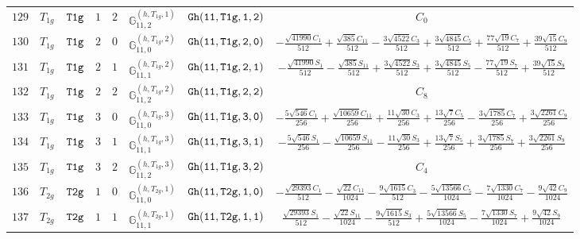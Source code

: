 \documentclass[fleqn,8pt]{jsarticle}
\begin{document}
\begin{table}[ht!]
\begin{center}
\begin{tabular}{cccccccc}
$ 129 $ & $ T_{1g} $ & $ {\tt T1g} $ & $ 1 $ & $ 2 $ & $ \mathbb{G}_{11,2}^{(h,T_{1g},1)} $ & $ {\tt Gh(11,T1g,1,2)} $ & $ C_{0} $ \\
$ 130 $ & $ T_{1g} $ & $ {\tt T1g} $ & $ 2 $ & $ 0 $ & $ \mathbb{G}_{11,0}^{(h,T_{1g},2)} $ & $ {\tt Gh(11,T1g,2,0)} $ & $ - \frac{\sqrt{41990} C_{1}}{512} + \frac{\sqrt{385} C_{11}}{512} - \frac{3 \sqrt{4522} C_{3}}{512} + \frac{3 \sqrt{4845} C_{5}}{512} + \frac{77 \sqrt{19} C_{7}}{512} + \frac{39 \sqrt{15} C_{9}}{512} $ \\
$ 131 $ & $ T_{1g} $ & $ {\tt T1g} $ & $ 2 $ & $ 1 $ & $ \mathbb{G}_{11,1}^{(h,T_{1g},2)} $ & $ {\tt Gh(11,T1g,2,1)} $ & $ - \frac{\sqrt{41990} S_{1}}{512} - \frac{\sqrt{385} S_{11}}{512} + \frac{3 \sqrt{4522} S_{3}}{512} + \frac{3 \sqrt{4845} S_{5}}{512} - \frac{77 \sqrt{19} S_{7}}{512} + \frac{39 \sqrt{15} S_{9}}{512} $ \\
$ 132 $ & $ T_{1g} $ & $ {\tt T1g} $ & $ 2 $ & $ 2 $ & $ \mathbb{G}_{11,2}^{(h,T_{1g},2)} $ & $ {\tt Gh(11,T1g,2,2)} $ & $ C_{8} $ \\
$ 133 $ & $ T_{1g} $ & $ {\tt T1g} $ & $ 3 $ & $ 0 $ & $ \mathbb{G}_{11,0}^{(h,T_{1g},3)} $ & $ {\tt Gh(11,T1g,3,0)} $ & $ - \frac{5 \sqrt{546} C_{1}}{256} + \frac{\sqrt{10659} C_{11}}{256} + \frac{11 \sqrt{30} C_{3}}{256} + \frac{13 \sqrt{7} C_{5}}{256} - \frac{3 \sqrt{1785} C_{7}}{256} + \frac{3 \sqrt{2261} C_{9}}{256} $ \\
$ 134 $ & $ T_{1g} $ & $ {\tt T1g} $ & $ 3 $ & $ 1 $ & $ \mathbb{G}_{11,1}^{(h,T_{1g},3)} $ & $ {\tt Gh(11,T1g,3,1)} $ & $ - \frac{5 \sqrt{546} S_{1}}{256} - \frac{\sqrt{10659} S_{11}}{256} - \frac{11 \sqrt{30} S_{3}}{256} + \frac{13 \sqrt{7} S_{5}}{256} + \frac{3 \sqrt{1785} S_{7}}{256} + \frac{3 \sqrt{2261} S_{9}}{256} $ \\
$ 135 $ & $ T_{1g} $ & $ {\tt T1g} $ & $ 3 $ & $ 2 $ & $ \mathbb{G}_{11,2}^{(h,T_{1g},3)} $ & $ {\tt Gh(11,T1g,3,2)} $ & $ C_{4} $ \\
$ 136 $ & $ T_{2g} $ & $ {\tt T2g} $ & $ 1 $ & $ 0 $ & $ \mathbb{G}_{11,0}^{(h,T_{2g},1)} $ & $ {\tt Gh(11,T2g,1,0)} $ & $ - \frac{\sqrt{29393} C_{1}}{512} - \frac{\sqrt{22} C_{11}}{1024} - \frac{9 \sqrt{1615} C_{3}}{512} - \frac{5 \sqrt{13566} C_{5}}{1024} - \frac{7 \sqrt{1330} C_{7}}{1024} - \frac{9 \sqrt{42} C_{9}}{1024} $ \\
$ 137 $ & $ T_{2g} $ & $ {\tt T2g} $ & $ 1 $ & $ 1 $ & $ \mathbb{G}_{11,1}^{(h,T_{2g},1)} $ & $ {\tt Gh(11,T2g,1,1)} $ & $ \frac{\sqrt{29393} S_{1}}{512} - \frac{\sqrt{22} S_{11}}{1024} - \frac{9 \sqrt{1615} S_{3}}{512} + \frac{5 \sqrt{13566} S_{5}}{1024} - \frac{7 \sqrt{1330} S_{7}}{1024} + \frac{9 \sqrt{42} S_{9}}{1024} $ \\

\end{tabular}
\end{center}
\end{table}
\end{document}
